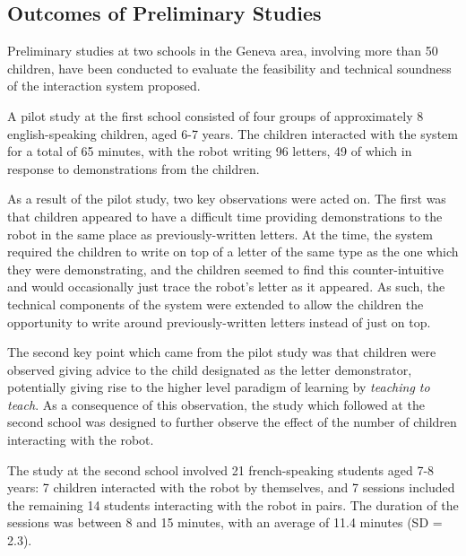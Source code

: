 \documentclass{sig-alternate}
\begin{document}
\subsection{Outcomes of Preliminary Studies}

Preliminary studies at two schools in the Geneva area, involving more than 50 children, 
have been conducted to evaluate the feasibility and technical soundness of the 
interaction system proposed. 

A pilot study at the first school consisted of four groups of
approximately 8 english-speaking children, aged 6-7 years. The children
interacted with the system for a total of 65 minutes, with the robot writing 96
letters, 49 of which in response to demonstrations from the children. 

As a result of the pilot study, two key observations were acted on. The first
was that children appeared to have a difficult time providing demonstrations to
the robot in the same place as previously-written letters. At the time, the
system required the children to write on top of a letter of the same type as the
one which they were demonstrating, and the children seemed to find this
counter-intuitive and would occasionally just trace the robot's letter as it
appeared. As such, the technical components of the system were extended to allow
the children the opportunity to write around previously-written letters instead
of just on top. 

The second key point which came from the pilot study was that children were
observed giving advice to the child designated as the letter demonstrator,
potentially giving rise to the higher level paradigm of learning by
\emph{teaching to teach}. As a consequence of this observation, the study which
followed at the second school was designed to further observe the effect of the
number of children interacting with the robot.

The study at the second school involved 21 french-speaking students aged 7-8 years: 7 children
interacted with the robot by themselves, and 7 sessions included the remaining
14 students interacting with the robot in pairs. The duration of the sessions
was between 8 and 15 minutes, with an average of 11.4 minutes (SD = 2.3). %
%
%
\end{document}
